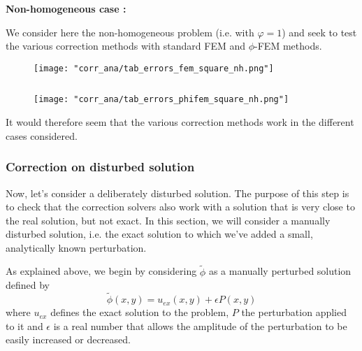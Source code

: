 \begin{enumerate}[label=\textbullet]
	\textbf{Non-homogeneous case :}
	
	We consider here the non-homogeneous problem (i.e. with $\varphi=1$) and seek to test the various correction methods with standard FEM and $\phi$-FEM methods.
	
	\begin{minipage}{0.48\linewidth}
		\begin{figure}[H]
			\centering
			\texttt{[image: "corr\_ana/tab\_errors\_fem\_square\_nh.png"]}
			\label{tab_errors_fem_square_nh}
		\end{figure} 
	\end{minipage} $\qquad$
	\begin{minipage}{0.48\linewidth} \qquad 
		\begin{figure}[H]
			\centering
			\texttt{[image: "corr\_ana/tab\_errors\_phifem\_square\_nh.png"]}
			\label{tab_errors_phifem_square_nh}
		\end{figure} 
	\end{minipage}
\end{enumerate}

It would therefore seem that the various correction methods work in the different cases considered. 

\subsubsection{Correction on disturbed solution} \label{Corr.results.disturbed}

Now, let's consider a deliberately disturbed solution. The purpose of this step is to check that the correction solvers also work with a solution that is very close to the real solution, but not exact. In this section, we will consider a manually disturbed solution, i.e. the exact solution to which we've added a small, analytically known perturbation.

As explained above, we begin by considering $\tilde{\phi}$ as a manually perturbed solution defined by
\begin{equation*}
	\tilde{\phi}(x,y)=u_{ex}(x,y)+\epsilon P(x,y)
\end{equation*}
where $u_{ex}$ defines the exact solution to the problem, $P$ the perturbation applied to it and $\epsilon$ is a real number that allows the amplitude of the perturbation to be easily increased or decreased. 

